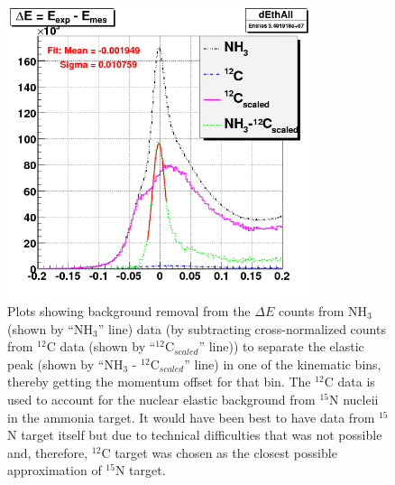 \begin{figure}[H]%
\centering
  \leavevmode \includegraphics[width=0.8\textwidth]{figuresEG4/FigKineCor/dE_elastProdEb3.png} 
  \caption[Background removal from $\Delta E$]{Plots showing background removal from the $\Delta E$ counts from NH$_3$ 
(shown by ``NH$_3$'' line) data (by subtracting cross-normalized counts from $^{12}$C data (shown by ``$^{12}$C$_{scaled}$'' 
line)) to separate the elastic peak (shown by ``NH$_3$ - $^{12}$C$_{scaled}$'' line) in one of the kinematic bins, thereby 
getting the momentum offset for that bin. The $^{12}$C data is used to account for the nuclear elastic background from $^{15}$N
nucleii in the ammonia target. It would have been best to have data from $^{15}$N target itself but due to technical difficulties
that was not possible and, therefore, $^{12}$C target was chosen as the closest possible approximation of $^{15}$N target.}
\label{sec6dEall}
\end{figure}



